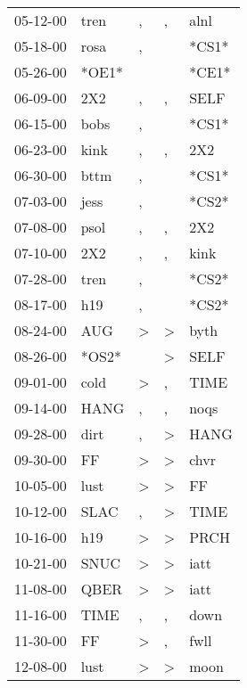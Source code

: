 \begin{supertabular}{lllll}
 05-12-00 &   tren &             , &             , &   alnl \\
 05-18-00 &   rosa &             , &               &  *CS1* \\
 05-26-00 &  *OE1* &               &               &  *CE1* \\
 06-09-00 &    2X2 &             , &             , &   SELF \\
 06-15-00 &   bobs &             , &               &  *CS1* \\
 06-23-00 &   kink &             , &             , &    2X2 \\
 06-30-00 &   bttm &             , &               &  *CS1* \\
 07-03-00 &   jess &             , &               &  *CS2* \\
 07-08-00 &   psol &             , &             , &    2X2 \\
 07-10-00 &    2X2 &             , &             , &   kink \\
 07-28-00 &   tren &             , &               &  *CS2* \\
 08-17-00 &    h19 &             , &               &  *CS2* \\
 08-24-00 &    AUG &  \textgreater &  \textgreater &   byth \\
 08-26-00 &  *OS2* &               &  \textgreater &   SELF \\
 09-01-00 &   cold &  \textgreater &             , &   TIME \\
 09-14-00 &   HANG &             , &             , &   noqs \\
 09-28-00 &   dirt &             , &  \textgreater &   HANG \\
 09-30-00 &     FF &  \textgreater &  \textgreater &   chvr \\
 10-05-00 &   lust &  \textgreater &  \textgreater &     FF \\
 10-12-00 &   SLAC &             , &  \textgreater &   TIME \\
 10-16-00 &    h19 &  \textgreater &  \textgreater &   PRCH \\
 10-21-00 &   SNUC &  \textgreater &  \textgreater &   iatt \\
 11-08-00 &   QBER &  \textgreater &  \textgreater &   iatt \\
 11-16-00 &   TIME &             , &             , &   down \\
 11-30-00 &     FF &  \textgreater &             , &   fwll \\
 12-08-00 &   lust &  \textgreater &  \textgreater &   moon \\

\end{supertabular}
